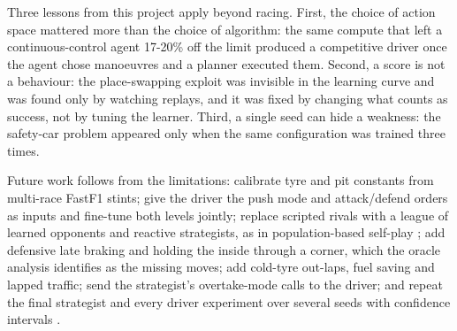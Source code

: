 \documentclass{ieeeaccess}
\begin{document}
Three lessons from this project apply beyond racing. First, the choice of action
space mattered more than the choice of algorithm: the same compute that left a
continuous-control agent 17-20\% off the limit produced a competitive driver once the
agent chose manoeuvres and a planner executed them. Second, a score is not a
behaviour: the place-swapping exploit was invisible in the learning curve and was
found only by watching replays, and it was fixed by changing what counts as
success, not by tuning the learner. Third, a single seed can hide a weakness: the
safety-car problem appeared only when the same configuration was trained three
times.

Future work follows from the limitations: calibrate tyre and pit constants from
multi-race FastF1 stints; give the driver the push mode and attack/defend orders as
inputs and fine-tune both levels jointly; replace scripted rivals with a league of
learned opponents and reactive strategists, as in population-based self-play
\cite{b4,b14}; add defensive late braking and holding the inside through a corner,
which the oracle analysis identifies as the missing moves; add cold-tyre out-laps,
fuel saving and lapped traffic; send the strategist's overtake-mode calls to the
driver; and repeat the final strategist and every driver experiment over several
seeds with confidence intervals \cite{b37,b38}.
\end{document}
